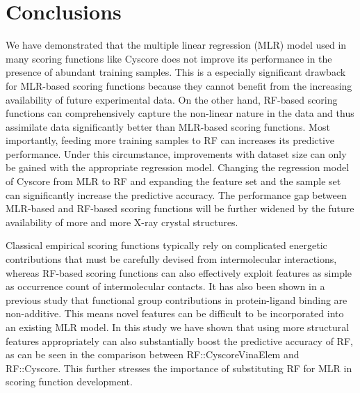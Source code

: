 \section{Conclusions}

We have demonstrated that the multiple linear regression (MLR) model used in many scoring functions like Cyscore does not improve its performance in the presence of abundant training samples. This is a especially significant drawback for MLR-based scoring functions because they cannot benefit from the increasing availability of future experimental data. On the other hand, RF-based scoring functions can comprehensively capture the non-linear nature in the data and thus assimilate data significantly better than MLR-based scoring functions. Most importantly, feeding more training samples to RF can increases its predictive performance. Under this circumstance, improvements with dataset size can only be gained with the appropriate regression model. Changing the regression model of Cyscore from MLR to RF and expanding the feature set and the sample set can significantly increase the predictive accuracy. The performance gap between MLR-based and RF-based scoring functions will be further widened by the future availability of more and more X-ray crystal structures.

Classical empirical scoring functions typically rely on complicated energetic contributions that must be carefully devised from intermolecular interactions, whereas RF-based scoring functions can also effectively exploit features as simple as occurrence count of intermolecular contacts. It has also been shown in a previous study that functional group contributions in protein-ligand binding are non-additive. This means novel features can be difficult to be incorporated into an existing MLR model. In this study we have shown that using more structural features appropriately can also substantially boost the predictive accuracy of RF, as can be seen in the comparison between RF::CyscoreVinaElem and RF::Cyscore. This further stresses the importance of substituting RF for MLR in scoring function development.

\chapterend

